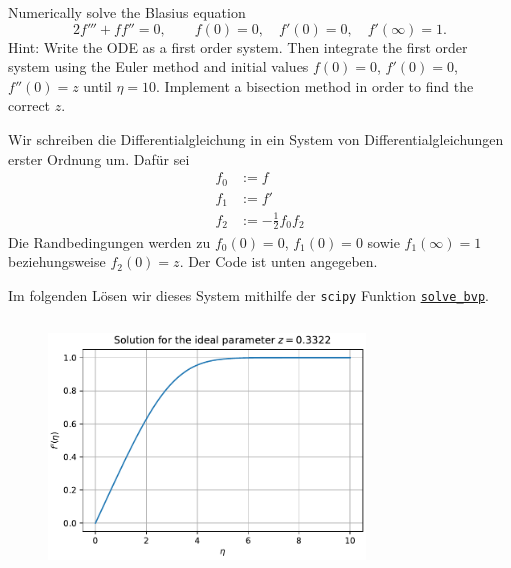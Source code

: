 \documentclass[12pt]{exam}
\begin{document}
\begin{questions}
    
    \question Numerically solve the Blasius equation
    \begin{equation*}
        2 f''' + ff'' = 0, \qquad f(0) = 0, \quad f'(0) = 0, \quad f'(\infty) = 1.
    \end{equation*}
    Hint: Write the ODE as a first order system. Then integrate the first order system using the Euler method and initial values $f(0) = 0$, $f'(0) = 0$, $f''(0) = z$ until $\eta = 10$. Implement a bisection method in order to find the correct $z$.

    \begin{solution}
        Wir schreiben die Differentialgleichung in ein System von Differentialgleichungen erster Ordnung um. Dafür sei
        \begin{align*}
            f_0 &:= f \\
            f_1 &:= f' \\
            f_2 &:= -\frac{1}{2} f_0 f_2
        \end{align*}
        Die Randbedingungen werden zu $f_0(0) = 0$, $f_1(0) = 0$ sowie $f_1(\infty) = 1$ beziehungsweise $f_2(0) = z$. Der Code ist unten angegeben.
    \end{solution}
    
    Im folgenden Lösen wir dieses System mithilfe der \texttt{scipy} Funktion \href{https://docs.scipy.org/doc/scipy/reference/generated/scipy.integrate.solve_bvp.html}{\texttt{solve\_bvp}}.
    
    \inputminted[breaklines, fontsize=\small, frame=single, linenos=true]{python}{blasius_equation.py}
    
    \begin{figure}[!htbp]
        \centering
        \includegraphics[width=0.75\textwidth]{plot_blasius_equation.pdf}
        \label{fig:blasius_solution}
    \end{figure}
    

\end{questions}
\end{document}
